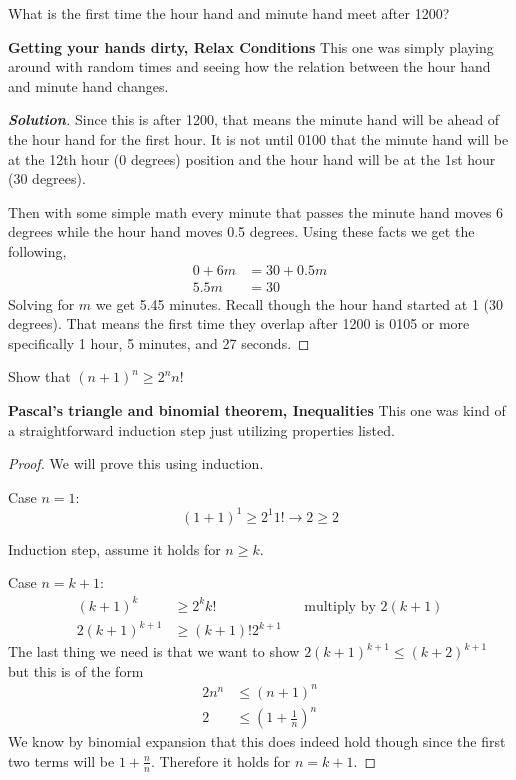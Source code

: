 \documentclass[11pt]{article}
\newenvironment{problem}[2][Problem\!]{\begin{trivlist}
\item[\hskip \labelsep {\bfseries #1}\hskip \labelsep {\bfseries #2}]}{\end{trivlist}}
\newenvironment{solution}{\begin{proof}[\textbf{\textit{Solution}}] }{\end{proof}}
\renewcommand{\geq}{\geqslant}
\renewcommand{\leq}{\leqslant}
\begin{document}

\begin{tcolorbox}
    \begin{problem} {OC 10/1 18}
        What is the first time the hour hand and minute hand meet after 1200?
    \end{problem}
    \textbf{Getting your hands dirty, Relax Conditions} This one was simply playing around with random times and seeing how the relation between the hour hand and minute hand changes. 
\end{tcolorbox}

\begin{solution}
    Since this is after 1200, that means the minute hand will be ahead of the hour hand for the first hour. It is not until 0100 that the minute hand will be at the 12th hour (0 degrees) position and the hour hand will be at the 1st hour (30 degrees). 

    Then with some simple math every minute that passes the minute hand moves 6 degrees while the hour hand moves 0.5 degrees. Using these facts we get the following,
    \begin{align*}
        0 + 6m &= 30 + 0.5m \\
        5.5m &= 30
    \end{align*}
    Solving for $m$ we get 5.45 minutes. Recall though the hour hand started at 1 (30 degrees). That means the first time they overlap after 1200 is 0105 or more specifically 1 hour, 5 minutes, and 27 seconds. 
\end{solution}

\begin{tcolorbox}
    \begin{problem} {OC - 10/25 - 61.}
        Show that $(n+1)^{n} \geq 2^{n}n!$
    \end{problem}
    \textbf{Pascal's triangle and binomial theorem, Inequalities} This one was kind of a straightforward induction step just utilizing properties listed. 
\end{tcolorbox}
\begin{proof}
    We will prove this using induction. 

    Case $n = 1$: \[(1+1)^{1} \geq 2^{1}1! \rightarrow 2 \geq 2\]

    Induction step, assume it holds for $n \geq k$.

    Case $n = k+1$:
    \begin{align*}
        (k+1)^{k} &\geq 2^{k}k! && \text{multiply by } 2(k+1) \\
        2(k+1)^{k+1} &\geq (k+1)!2^{k+1}
    \end{align*}
    The last thing we need is that we want to show $2(k+1)^{k+1} \leq (k+2)^{k+1}$ but this is of the form
    \begin{align*}
        2n^{n} &\leq (n+1)^{n} \\
        2 &\leq (1 + \frac{1}{n})^{n}
    \end{align*} 
    We know by binomial expansion that this does indeed hold though since the first two terms will be $1 + \frac{n}{n}$.
    Therefore it holds for $n = k+1$.
\end{proof}
\end{document}
